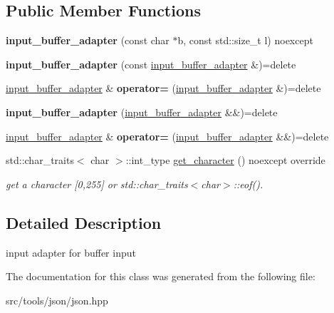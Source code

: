 \subsection*{Public Member Functions}
\begin{DoxyCompactItemize}
\item 
\mbox{\label{classnlohmann_1_1detail_1_1input__buffer__adapter_ad9b912fabdcb53de255e8c444d625ac3}} 
{\bfseries input\+\_\+buffer\+\_\+adapter} (const char $\ast$b, const std\+::size\+\_\+t l) noexcept
\item 
\mbox{\label{classnlohmann_1_1detail_1_1input__buffer__adapter_ada76d7b75c5d6b989af0e18687ef07b6}} 
{\bfseries input\+\_\+buffer\+\_\+adapter} (const \hyperlink{classnlohmann_1_1detail_1_1input__buffer__adapter}{input\+\_\+buffer\+\_\+adapter} \&)=delete
\item 
\mbox{\label{classnlohmann_1_1detail_1_1input__buffer__adapter_a0871125057d993684ba8e45fb2b8a76b}} 
\hyperlink{classnlohmann_1_1detail_1_1input__buffer__adapter}{input\+\_\+buffer\+\_\+adapter} \& {\bfseries operator=} (\hyperlink{classnlohmann_1_1detail_1_1input__buffer__adapter}{input\+\_\+buffer\+\_\+adapter} \&)=delete
\item 
\mbox{\label{classnlohmann_1_1detail_1_1input__buffer__adapter_ab6bc6bb785408b74af284a5b7544d9dc}} 
{\bfseries input\+\_\+buffer\+\_\+adapter} (\hyperlink{classnlohmann_1_1detail_1_1input__buffer__adapter}{input\+\_\+buffer\+\_\+adapter} \&\&)=delete
\item 
\mbox{\label{classnlohmann_1_1detail_1_1input__buffer__adapter_a19bb3ff68048a2fc8ecc41a013af37ae}} 
\hyperlink{classnlohmann_1_1detail_1_1input__buffer__adapter}{input\+\_\+buffer\+\_\+adapter} \& {\bfseries operator=} (\hyperlink{classnlohmann_1_1detail_1_1input__buffer__adapter}{input\+\_\+buffer\+\_\+adapter} \&\&)=delete
\item 
\mbox{\label{classnlohmann_1_1detail_1_1input__buffer__adapter_ae9e195b04f3551fafb0925aafba00124}} 
std\+::char\+\_\+traits$<$ char $>$\+::int\+\_\+type \hyperlink{classnlohmann_1_1detail_1_1input__buffer__adapter_ae9e195b04f3551fafb0925aafba00124}{get\+\_\+character} () noexcept override
\begin{DoxyCompactList}\small\item\em get a character \mbox{[}0,255\mbox{]} or std\+::char\+\_\+traits$<$char$>$\+::eof(). \end{DoxyCompactList}\end{DoxyCompactItemize}


\subsection{Detailed Description}
input adapter for buffer input 

The documentation for this class was generated from the following file\+:\begin{DoxyCompactItemize}
\item 
src/tools/json/json.\+hpp\end{DoxyCompactItemize}
